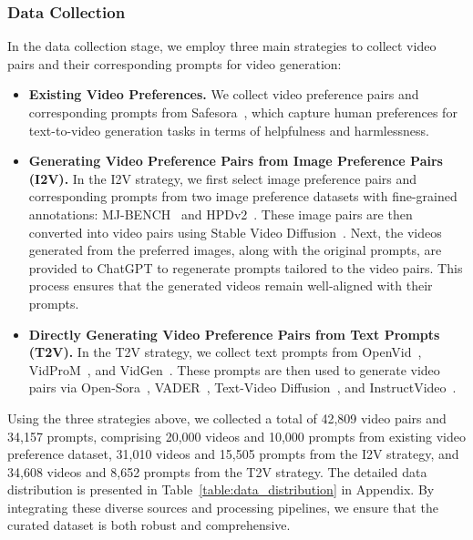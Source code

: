 \subsubsection{Data Collection}
\vspace{-0.3em}
In the data collection stage, we employ three main strategies to collect video pairs and their corresponding prompts for video generation:
\begin{itemize}[leftmargin=*]
\vspace{-0.5em}
    \item \textbf{Existing Video Preferences.} We collect video preference pairs and corresponding prompts from Safesora~\citep{dai2024safesorasafetyalignmenttext2video}, which capture human preferences for text-to-video generation tasks in terms of helpfulness and harmlessness.
    \vspace{-1em}
    \item \textbf{Generating Video Preference Pairs from Image Preference Pairs (I2V).} In the I2V strategy, we first select image preference pairs and corresponding prompts from two image preference datasets with fine-grained annotations: MJ-BENCH~\citep{chen2024mjbenchmultimodalrewardmodel} and HPDv2~\citep{wu2023human}. These image pairs are then converted into video pairs using Stable Video Diffusion~\citep{blattmann2023stablevideodiffusionscaling}. Next, the videos generated from the preferred images, along with the original prompts, are provided to ChatGPT to regenerate prompts tailored to the video pairs. This process ensures that the generated videos remain well-aligned with their prompts.
    \vspace{-0.5em}
    \item \textbf{Directly Generating Video Preference Pairs from Text Prompts (T2V).} In the T2V strategy, we collect text prompts from OpenVid~\cite{nan2024openvid}, VidProM~\cite{wang2024vidprom}, and VidGen~\cite{tan2024vidgen}. These prompts are then used to generate video pairs via Open-Sora~\cite{opensora}, VADER~\cite{prabhudesai2024video}, Text-Video Diffusion~\cite{wang2023modelscopetexttovideotechnicalreport}, and InstructVideo~\cite{yuan2023instructvideoinstructingvideodiffusion}.
    \vspace{-1em}
\end{itemize}
Using the three strategies above, we collected a total of 42,809 video pairs and 34,157 prompts, comprising 20,000 videos and 10,000 prompts from existing video preference dataset, 31,010 videos and 15,505 prompts from the I2V strategy, and 34,608 videos and 8,652 prompts from the T2V strategy. The detailed data distribution is presented in Table~\ref{table:data_distribution} in Appendix. By integrating these diverse sources and processing pipelines, we ensure that the curated dataset is both robust and comprehensive.








